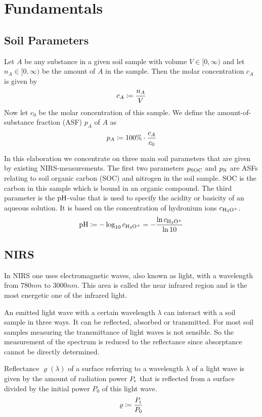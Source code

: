 \section{Fundamentals}
\label{sec:fundamentals}
	
	\subsection{Soil Parameters}
	\label{ssec:soil-parameters}
	
		Let $A$ be any substance in a given soil sample with volume $V\in[0,\infty)$ and let $n_A\in[0,\infty)$ be the amount of $A$ in the sample.
		Then the molar concentration $c_A$ is given by
		\[
			c_A \coloneqq \frac{n_A}{V}
		\]
		Now let $c_0$ be the molar concentration of this sample.
		We define the amount-of-substance fraction (ASF) $p_A$ of $A$ as 
		\[
			p_A \coloneqq 100\%\cdot\frac{c_A}{c_0}
		\]

		In this elaboration we concentrate on three main soil parameters that are given by existing NIRS-measurements.
		The first two parameters $p_{\mathrm{SOC}}$ and $p_{\mathrm{N}}$ are ASFs relating to soil organic carbon (SOC) and nitrogen in the soil sample.
		SOC is the carbon in this sample which is bound in an organic compound.
		The third parameter is the $\mathrm{pH}$-value that is used to specify the acidity or basicity of an aqueous solution.
		It is based on the concentration of hydronium ions $c_{\mathrm{H_3O^+}}$.
		\[
			\mathrm{pH} \coloneqq -\log_{10} c_{\mathrm{H_3O^+}} = -\frac{\ln c_{\mathrm{H_3O^+}}}{\ln 10}
		\]
	

	\subsection{NIRS}
	\label{ssec:nirs}
	
		In NIRS one uses electromagnetic waves, also known as light, with a wavelength from $780\unit{nm}$ to $3000\unit{nm}$.
		This area is called the near infrared region and is the most energetic one of the infrared light.

		An emitted light wave with a certain wavelength $\lambda$ can interact with a soil sample in three ways.
		It can be reflected, absorbed or transmitted.
		For most soil samples measuring the transmittance of light waves is not sensible.
		So the measurement of the spectrum is reduced to the reflectance since absorptance cannot be directly determined.
		
		

		Reflectance $\varrho(\lambda)$ of a surface referring to a wavelength $\lambda$ of a light wave is given by the amount of radiation power $P_{\mathrm{r}}$ that is reflected from a surface divided by the initial power $P_0$ of this light wave.
		\[
			\varrho \coloneqq \frac{P_{\mathrm{r}}}{P_0}
		\]
	

